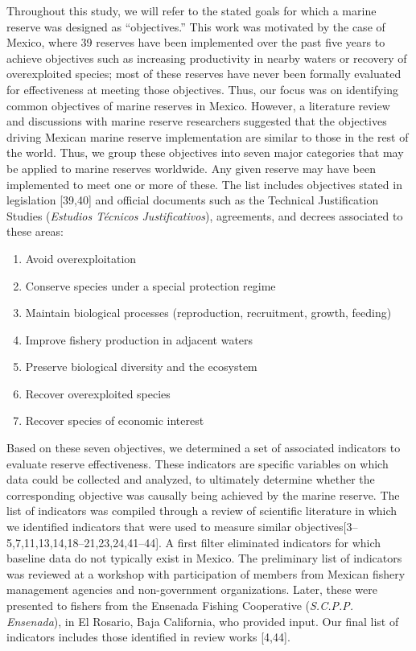 \documentclass[12pt,]{article}
\providecommand{\tightlist}{%
  \setlength{\itemsep}{0pt}\setlength{\parskip}{0pt}}
\begin{document}
Throughout this study, we will refer to the stated goals for which a
marine reserve was designed as ``objectives.'' This work was motivated
by the case of Mexico, where 39 reserves have been implemented over the
past five years to achieve objectives such as increasing productivity in
nearby waters or recovery of overexploited species; most of these
reserves have never been formally evaluated for effectiveness at meeting
those objectives. Thus, our focus was on identifying common objectives
of marine reserves in Mexico. However, a literature review and
discussions with marine reserve researchers suggested that the
objectives driving Mexican marine reserve implementation are similar to
those in the rest of the world. Thus, we group these objectives into
seven major categories that may be applied to marine reserves worldwide.
Any given reserve may have been implemented to meet one or more of
these. The list includes objectives stated in legislation {[}39,40{]}
and official documents such as the Technical Justification Studies
(\emph{Estudios Técnicos Justificativos}), agreements, and decrees
associated to these areas:

\begin{enumerate}
\def\labelenumi{\arabic{enumi}.}
\tightlist
\item
  Avoid overexploitation
\item
  Conserve species under a special protection regime
\item
  Maintain biological processes (reproduction, recruitment, growth,
  feeding)
\item
  Improve fishery production in adjacent waters
\item
  Preserve biological diversity and the ecosystem
\item
  Recover overexploited species
\item
  Recover species of economic interest
\end{enumerate}

Based on these seven objectives, we determined a set of associated
indicators to evaluate reserve effectiveness. These indicators are
specific variables on which data could be collected and analyzed, to
ultimately determine whether the corresponding objective was causally
being achieved by the marine reserve. The list of indicators was
compiled through a review of scientific literature in which we
identified indicators that were used to measure similar
objectives{[}3--5,7,11,13,14,18--21,23,24,41--44{]}. A first filter
eliminated indicators for which baseline data do not typically exist in
Mexico. The preliminary list of indicators was reviewed at a workshop
with participation of members from Mexican fishery management agencies
and non-government organizations. Later, these were presented to fishers
from the Ensenada Fishing Cooperative (\emph{S.C.P.P. Ensenada}), in El
Rosario, Baja California, who provided input. Our final list of
indicators includes those identified in review works {[}4,44{]}.
\end{document}
